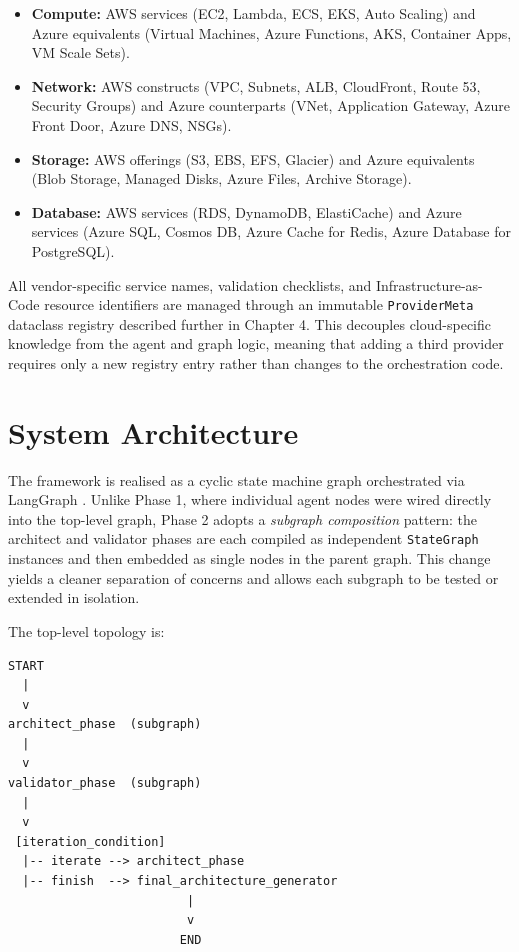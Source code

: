\begin{itemize}
    \item \textbf{Compute:} AWS services (EC2, Lambda, ECS, EKS, Auto Scaling) and Azure equivalents (Virtual Machines, Azure Functions, AKS, Container Apps, VM Scale Sets).
    \item \textbf{Network:} AWS constructs (VPC, Subnets, ALB, CloudFront, Route 53, Security Groups) and Azure counterparts (VNet, Application Gateway, Azure Front Door, Azure DNS, NSGs).
    \item \textbf{Storage:} AWS offerings (S3, EBS, EFS, Glacier) and Azure equivalents (Blob Storage, Managed Disks, Azure Files, Archive Storage).
    \item \textbf{Database:} AWS services (RDS, DynamoDB, ElastiCache) and Azure services (Azure SQL, Cosmos DB, Azure Cache for Redis, Azure Database for PostgreSQL).
\end{itemize}

All vendor-specific service names, validation checklists, and Infrastructure-as-Code resource identifiers are managed through an immutable \texttt{ProviderMeta} dataclass registry described further in Chapter 4. This decouples cloud-specific knowledge from the agent and graph logic, meaning that adding a third provider requires only a new registry entry rather than changes to the orchestration code.

\section{System Architecture}

The framework is realised as a cyclic state machine graph orchestrated via LangGraph \cite{langgraph2024docs}. Unlike Phase 1, where individual agent nodes were wired directly into the top-level graph, Phase 2 adopts a \textit{subgraph composition} pattern: the architect and validator phases are each compiled as independent \texttt{StateGraph} instances and then embedded as single nodes in the parent graph. This change yields a cleaner separation of concerns and allows each subgraph to be tested or extended in isolation.

The top-level topology is:

\begin{verbatim}
START
  |
  v
architect_phase  (subgraph)
  |
  v
validator_phase  (subgraph)
  |
  v
 [iteration_condition]
  |-- iterate --> architect_phase
  |-- finish  --> final_architecture_generator
                         |
                         v
                        END
\end{verbatim}

